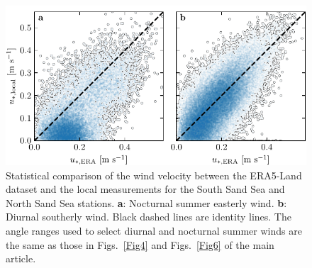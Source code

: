 \begin{figure}[p]
\centering
\includegraphics[scale=1]{Figures/Figure7_supp.pdf}
\caption{Statistical comparison of the wind velocity between the ERA5-Land dataset and the local measurements for the South Sand Sea and North Sand Sea stations. \textbf{a}: Nocturnal summer easterly wind. \textbf{b}: Diurnal southerly wind. Black dashed lines are identity lines. The angle ranges used to select diurnal and nocturnal summer winds are the same as those in Figs.~\ref{Fig4} and Figs.~\ref{Fig6} of the main article.}
\label{Fig7_supp}
\end{figure}

